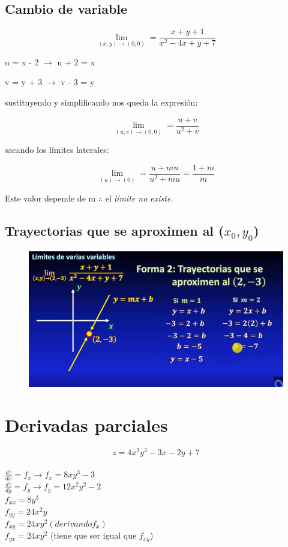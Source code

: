 \documentclass[letterpaper,12pt]{article}
\begin{document}
\begin{sloppypar}
\subsection{Cambio de variable}
$$\lim_{(x,y) \to (0,0)}  = \frac{x + y + 1}{x^2 - 4x + y + 7}$$

u = x - 2 $\rightarrow$ u + 2 = x

v = y + 3 $\rightarrow$ v - 3 = y

sustituyendo y simplificando nos queda la expresión: 

$$\lim_{(u,v) \to (0,0)} = \frac{u + v}{u^2 + v}$$

sacando los límites laterales: 

$$ \displaystyle  \lim_{(u) \to (0)} = \frac{u + mu}{u^2 + mu} = \frac{1 + m}{m}$$

Este valor depende de m $\therefore$ el \textit{límite no existe.}

\subsection{Trayectorias que se aproximen al ($x_{0},y_{0}$)}
\begin{figure}
    \centering
    \includegraphics{images/Captura de pantalla 2023-07-06 192610.png}
\end{figure}
\newpage

\section{Derivadas parciales}

$$z = 4x^2y^3 - 3x - 2y + 7$$
\vspace{0.3cm}\\
$\displaystyle \frac{dz}{dx} = f_x \longrightarrow f_x = 8xy^3 - 3$
\vspace{0.3cm}\\ 
$\displaystyle \frac{dz}{dy} = f_y \longrightarrow f_y = 12x^2y^2 - 2 $
\vspace{0.3cm}\\ 
$f_{xx} = 8y^3$
\vspace{0.3cm}\\ 
$f_{yy} = 24x^2y$
\vspace{0.3cm}\\ 
$f_{xy} = 24xy^2 (derivando f_{x})$
\vspace{0.3cm}\\ 
$f_{yx} = 24xy^2$ (tiene que ser igual que $f_{xy}$)

\end{sloppypar}
\end{document}
